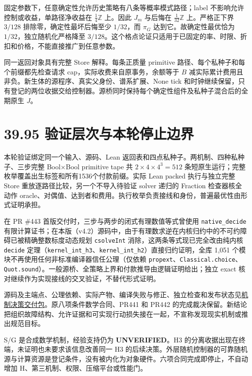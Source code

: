 \documentclass[
  11pt,
  oneside]{book}
\begin{document}
固定参数下，任意确定性允许历史策略有八条等概率模式路径；label 不影响允许控制或收益，单路径净收益在 \(\tfrac14\mathbb Z\) 上。因此 \(J_m\) 与后悔在 \(\tfrac1{32}\mathbb Z\) 上。严格正下界 \(3/128\) 排除零，确定性最坏后悔至少 \(1/32\)，而 \(\pi_G\) 达到它。故确定性最优恰为 \(1/32\)，独立随机化严格降至 \(3/128\)。这个格点论证只适用于已固定的率、时限、折扣和价格，不能直接推广到任意参数。

同一返回对象具有完整 Store 解释。每条正质量 primitive 路径、每个私种子和每个前缀都先检查请求 cap，实际收费来自原事务，余额等于 \(B\) 减实际累计费用且非负。新生体的源程序、真实父身份、谱系扩展、None tick 和时钟继续保留，只有登记的两位收据交给控制器。源桥同时保持每个确定性组件及私种子混合后的全期原生 \(J\)。

\section{39.95 验证层次与本轮停止边界}\label{ux9a8cux8bc1ux5c42ux6b21ux4e0eux672cux8f6eux505cux6b62ux8fb9ux754c}

本轮验证绑定同一个输入、源码、Lean 返回表和四点私种子。两机制、四种私种子、三步完整 Bool×Bool primitive tape 共 \(2\times4\times4^3=512\) 条短原生运行；完整枚举覆盖出生标签和所有1536个付款前缀。实际 Lean packed 执行与独立完整 Store 重放逐路径比较，另一个不导入待验证 solver 递归的 Fraction 检查器核全动作 oracle、对偶值、达到者和费用。执行枚举负责接线和身份，普遍最优性由形式证明承担。

在 PR \#443 首版交付时，三步与两步的闭式有理数值等式曾使用 \nolinkurl{native_decide} 有限计算证书；在本版（v4.2）源码中，由于有理数求逆在内核归约中的不可约障碍已被精确整数标度动态规划 \texttt{csolveInt} 消除，这两条等式现已完全改由纯内核 \texttt{decide} 定理（\nolinkurl{kernel_int_h3}、\nolinkurl{kernel_int_h2}）直接归约证明，全库 1,051 个模块不再使用任何非标准编译器信任公理（仅依赖 \texttt{propext}、\nolinkurl{Classical.choice}、\texttt{Quot.sound}）。一般源桥、全策略上界和付款推导由逻辑证明给出；独立 exact 核对继续作为实现接线的交叉验证，不替代形式证明。

源码及主端点、公理依赖、实际产物、编译失败与修正、独立检查和发布状态见\href{../formalization/ueot-core/docs/compression/theory_completion/unified_closure/mechanism_decision_closure_v1/README.md}{机制决策交付包}。原八项条件数学合同、PR441 和 PR442 的完成裁决保留。新结论把组织故障结构、允许证据和可实现行动损失接在一起，不宣称发现现实机制或推出规范目标。

S/G 是合成数学机制，经验支持仍为 \textbf{UNVERIFIED}。H3 的分离收据出现在终端，未证明也未要求该信息改善同一 H3 的后续决策。外层随机控制器的可靠随机源与计算资源是登记条件，没有被内化为对象硬件。六项合同完成即停止，不自动增加 H、第三机制、权限、压缩平台或性能门。
\end{document}
